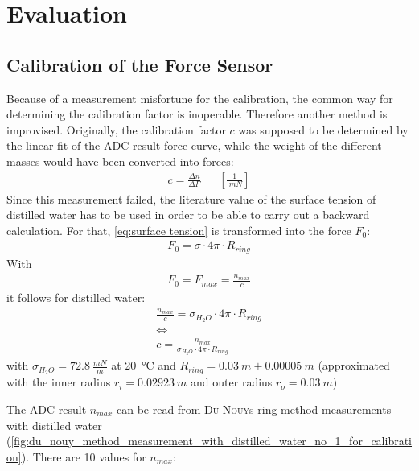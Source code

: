 \chapter{Evaluation}
    \section{Calibration of the Force Sensor}
        Because of a measurement misfortune for the calibration, the common way for determining the calibration factor is inoperable. Therefore another method is improvised. Originally, the calibration factor $ c $ was supposed to be determined by the linear fit of the ADC result-force-curve, while the weight of the different masses would have been converted into forces:
        \begin{align}
            c=\frac{\Delta n}{\Delta F} &&\left[\frac{1}{\SI{}{mN}}\right]
        \end{align}
        Since this measurement failed, the literature value of the surface tension of distilled water has to be used in order to be able to carry out a backward calculation. For that, \cref{eq:surface tension} is transformed into the force $ F_0 $:
        \begin{align*}
            F_0=\sigma \cdot 4\pi \cdot R_{ring}
        \end{align*}
        With
        \begin{align}
            F_0=F_{max}=\frac{n_{max}}{c}
            \label{eq:force}
        \end{align}
        it follows for distilled water:
        \begin{gather}
            \frac{n_{max}}{c} = \sigma_{H_2O} \cdot 4\pi \cdot R_{ring} \nonumber \\
            \Leftrightarrow \nonumber \\
            c = \frac{n_{max}}{\sigma_{H_2O} \cdot 4\pi \cdot R_{ring}}
            \label{eq:calibration factor}
        \end{gather}
        with \(\sigma_{H_2O}=\SI{72.8}{\frac{mN}{m}}\) at \SI{20}{\celsius} \cite{Eichler.2016} and \(R_{ring} = \SI{0.03}{m} \pm \SI{0.00005}{m}\)
        (approximated with the inner radius $ r_i=\SI{0.02923}{m} $ and outer radius $ r_o=\SI{0.03}{m} $)\par\medskip
        The ADC result \(n_{max}\) can be read from \textsc{Du Noüy}s ring method measurements with distilled water (\cref{fig:du_nouy_method_measurement_with_distilled_water_no_1_for_calibration}).
        There are 10 values for \(n_{max}\):
